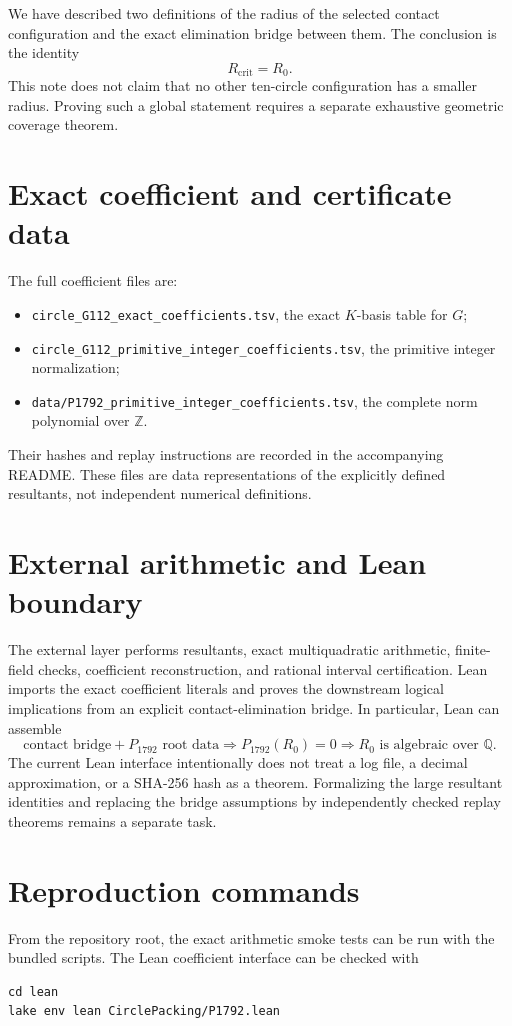 \documentclass[11pt,a4paper]{article}
\begin{document}
We have described two definitions of the radius of the selected contact
configuration and the exact elimination bridge between them.  The conclusion
is the identity
\[
 R_{\mathrm{crit}}=R_0.
\]
This note does not claim that no other ten-circle configuration has a smaller
radius.  Proving such a global statement requires a separate exhaustive
geometric coverage theorem.

\appendix
\section{Exact coefficient and certificate data}
\label{app:coefficients}

The full coefficient files are:
\begin{itemize}
\item \texttt{circle\_G112\_exact\_coefficients.tsv}, the exact $K$-basis table for $G$;
\item \texttt{circle\_G112\_primitive\_integer\_coefficients.tsv}, the primitive integer
      normalization;
\item \texttt{data/P1792\_primitive\_integer\_coefficients.tsv}, the complete norm
      polynomial over $\mathbb{Z}$.
\end{itemize}
Their hashes and replay instructions are recorded in the accompanying
README.  These files are data representations of the explicitly defined
resultants, not independent numerical definitions.

\section{External arithmetic and Lean boundary}
\label{app:boundary}

The external layer performs resultants, exact multiquadratic arithmetic,
finite-field checks, coefficient reconstruction, and rational interval
certification.  Lean imports the exact coefficient literals and proves the
downstream logical implications from an explicit contact-elimination bridge.
In particular, Lean can assemble
\[
\text{contact bridge}+P_{1792}\text{ root data}
\Longrightarrow P_{1792}(R_0)=0
\Longrightarrow R_0\text{ is algebraic over }\mathbb{Q}.
\]
The current Lean interface intentionally does not treat a log file, a decimal
approximation, or a SHA-256 hash as a theorem.  Formalizing the large
resultant identities and replacing the bridge assumptions by independently
checked replay theorems remains a separate task.

\section{Reproduction commands}

From the repository root, the exact arithmetic smoke tests can be run with
the bundled scripts.  The Lean coefficient interface can be checked with
\begin{verbatim}
cd lean
lake env lean CirclePacking/P1792.lean
\end{verbatim}
\end{document}
